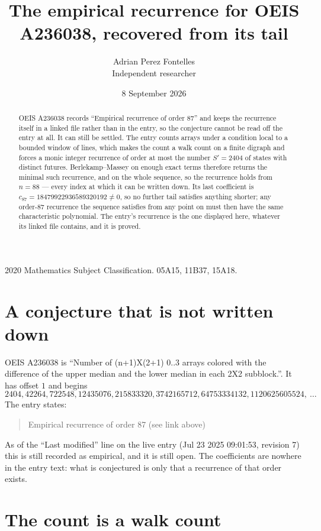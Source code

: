 \documentclass[11pt,a4paper]{article}
\title{The empirical recurrence for OEIS A236038, recovered from its tail}
\author{Adrian Perez Fontelles\\ \small Independent researcher}
\date{8 September 2026}
\theoremstyle{plain}
\theoremstyle{definition}
\begin{document}
\maketitle

\begin{abstract}
OEIS A236038 records ``Empirical recurrence of order $87$'' and keeps the recurrence itself in
a linked file rather than in the entry, so the conjecture cannot be read off the entry at all.
It can still be settled. The entry counts arrays under a condition local to a bounded window of
lines, which makes the count a walk count on a finite digraph and forces a monic integer
recurrence of order at most the number $S'=2404$ of states with distinct futures. Berlekamp--Massey on
enough exact terms therefore returns the minimal such recurrence, and on the whole sequence, so the recurrence holds from $n=88$ --- every index at which it can be written down.
Its last coefficient is $c_{87}=18479922936589320192\neq0$, so no further tail satisfies anything
shorter; any order-$87$ recurrence the sequence satisfies from any point on must then have
the same characteristic polynomial. The entry's recurrence is the one displayed here, whatever
its linked file contains, and it is proved.
\end{abstract}

\noindent\small 2020 Mathematics Subject Classification. 05A15, 11B37, 15A18.\normalsize

\section{A conjecture that is not written down}

OEIS A236038 is ``Number of (n+1)X(2+1) 0..3 arrays colored with the difference of the upper median and the lower median in each 2X2 subblock.''. It has offset $1$ and begins
\[
2404, 42264, 722548, 12435076, 215833320, 3742165712, 64753334132, 1120625605524,\ \dots
\]
The entry states:
\begin{quote}
Empirical recurrence of order 87 (see link above)
\end{quote}
As of the ``Last modified'' line on the live entry (Jul 23 2025 09:01:53, revision 7)
this is still recorded as empirical, and it is still open. The coefficients are nowhere in the
entry text: what is conjectured is only that a recurrence of that order exists.

\section{The count is a walk count}
\end{document}
